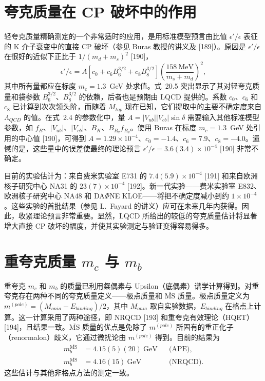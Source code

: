 \section{夸克质量在 CP 破坏中的作用}

轻夸克质量精确测定的一个非常适时的应用，是用标准模型预言由比值 $\epsilon'/\epsilon$ 表征的 K 介子衰变中的直接 CP 破坏（参见 Buras 教授的讲义及 [189]）。原因是 $\epsilon'/\epsilon$ 在很好的近似下正比于 $1/(m_d + m_s)^2$ [190]，
\begin{equation}
\epsilon'/\epsilon = A \left[c_0 + c_6 B_6^{3/2} + c_8 B_8^{3/2}\right] \left(\frac{158~\mathrm{MeV}}{m_s + m_d}\right)^2,
\end{equation}
其中所有量都应在标度 $m_c = 1.3$~GeV 处求值。式~20.5 突出显示了其对轻夸克质量和袋参数 $B_6^{3/2}$、$B_8^{3/2}$ 的依赖，后者也是预期由 LQCD 提供的。系数 $c_0$、$c_6$ 和 $c_8$ 已计算到次次领头阶，而随着 $M_{top}$ 现在已知，它们提取中的主要不确定度来自 $\Lambda_{QCD}$ 的值。在式~2.4 的参数化中，量 $A = |V_{ub}||V_{cb}| \sin\delta$ 需要输入其他标准模型参数，如 $f_B$、$|V_{ub}|$、$|V_{cb}|$、$B_K$、$B_{B_d} f_{B_d}$。使用 Buras 在标度 $m_c = 1.3$~GeV 处引用的中心值 [190]，可得到 $A = 1.29 \times 10^{-4}$、$c_0 = -1.4$、$c_6 = 7.9$、$c_8 = -4.0$。遗憾的是，这些量中的误差使最终的理论预言 $\epsilon'/\epsilon = 3.6(3.4) \times 10^{-4}$ [190] 非常不确定。

目前的实验估计为：来自费米实验室 E731 的 $7.4(5.9) \times 10^{-4}$ [191] 和来自欧洲核子研究中心 NA31 的 $23(7) \times 10^{-4}$ [192]。新一代实验——费米实验室 E832、欧洲核子研究中心 NA48 和 DA$\Phi$NE KLOE——将把不确定度减小到约 $1 \times 10^{-4}$。这些实验的首批结果（参见 L.~Fayard 的讲义）应可在未来几年内获得。因此，收紧理论预言非常重要。显然，LQCD 所给出的较低的夸克质量估计将显著增大直接 CP 破坏的幅度，并使其实验测定与验证变得容易得多。

\section{重夸克质量 $m_c$ 与 $m_b$}

重夸克 $m_c$ 和 $m_b$ 的质量已利用粲偶素与 Upsilon（底偶素）谱学计算得到。对重夸克存在两种不同的夸克质量定义——极点质量和 $\overline{\mathrm{MS}}$ 质量。极点质量定义为 $m^{(pole)} = (M_{onia} - E_{binding})/2$，其中 $M_{onia}$ 取自实验数据，$E_{binding}$ 在格点上计算。这一计算采用了两种途径，即 NRQCD [193] 和重夸克有效理论（HQET）[194]，且结果一致。$\overline{\mathrm{MS}}$ 质量的优点是免除了 $m^{(pole)}$ 所固有的重正化子（renormalon）歧义，它通过微扰论由 $m^{(pole)}$ 得到。目前的结果为
\begin{equation}
\begin{aligned}
m_b^{\overline{\mathrm{MS}}} &= 4.15(5)(20)~\mathrm{GeV} && \text{(APE)}, \\
m_b^{\overline{\mathrm{MS}}} &= 4.16(15)~\mathrm{GeV} && \text{(NRQCD)}.
\end{aligned}
\end{equation}
这些估计与其他非格点方法的测定一致。

